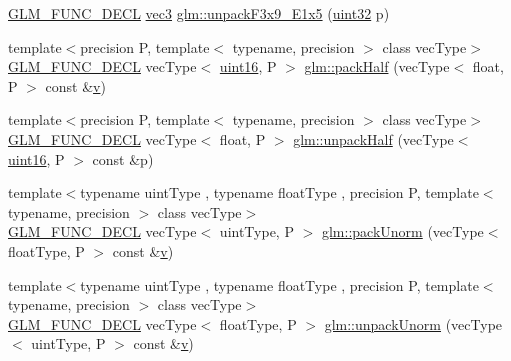 \begin{DoxyCompactItemize}
\item 
\mbox{\hyperlink{setup_8hpp_ab2d052de21a70539923e9bcbf6e83a51}{G\+L\+M\+\_\+\+F\+U\+N\+C\+\_\+\+D\+E\+CL}} \mbox{\hyperlink{group__core__types_ga1c47e8b3386109bc992b6c48e91b0be7}{vec3}} \mbox{\hyperlink{group__gtc__packing_ga15d8845a31e1e55d493803d0c8cb5910}{glm\+::unpack\+F3x9\+\_\+\+E1x5}} (\mbox{\hyperlink{group__gtc__type__precision_ga202b6a53c105fcb7e531f9b443518451}{uint32}} p)
\item 
{\footnotesize template$<$precision P, template$<$ typename, precision $>$ class vec\+Type$>$ }\\\mbox{\hyperlink{setup_8hpp_ab2d052de21a70539923e9bcbf6e83a51}{G\+L\+M\+\_\+\+F\+U\+N\+C\+\_\+\+D\+E\+CL}} vec\+Type$<$ \mbox{\hyperlink{group__gtc__type__precision_gad8c2939e1fdd8e5828b31d95c52255d5}{uint16}}, P $>$ \mbox{\hyperlink{group__gtc__packing_ga896d806b72e390eb953786cca3632ec9}{glm\+::pack\+Half}} (vec\+Type$<$ float, P $>$ const \&\mbox{\hyperlink{glad_8h_a14cfbe2fc2234f5504618905b69d1e06}{v}})
\item 
{\footnotesize template$<$precision P, template$<$ typename, precision $>$ class vec\+Type$>$ }\\\mbox{\hyperlink{setup_8hpp_ab2d052de21a70539923e9bcbf6e83a51}{G\+L\+M\+\_\+\+F\+U\+N\+C\+\_\+\+D\+E\+CL}} vec\+Type$<$ float, P $>$ \mbox{\hyperlink{group__gtc__packing_gaf3f9387834f8d8beadfe723c1dd247a7}{glm\+::unpack\+Half}} (vec\+Type$<$ \mbox{\hyperlink{group__gtc__type__precision_gad8c2939e1fdd8e5828b31d95c52255d5}{uint16}}, P $>$ const \&p)
\item 
{\footnotesize template$<$typename uint\+Type , typename float\+Type , precision P, template$<$ typename, precision $>$ class vec\+Type$>$ }\\\mbox{\hyperlink{setup_8hpp_ab2d052de21a70539923e9bcbf6e83a51}{G\+L\+M\+\_\+\+F\+U\+N\+C\+\_\+\+D\+E\+CL}} vec\+Type$<$ uint\+Type, P $>$ \mbox{\hyperlink{group__gtc__packing_gacb9a3df68172c1193c9d701a3fa4d88b}{glm\+::pack\+Unorm}} (vec\+Type$<$ float\+Type, P $>$ const \&\mbox{\hyperlink{glad_8h_a14cfbe2fc2234f5504618905b69d1e06}{v}})
\item 
{\footnotesize template$<$typename uint\+Type , typename float\+Type , precision P, template$<$ typename, precision $>$ class vec\+Type$>$ }\\\mbox{\hyperlink{setup_8hpp_ab2d052de21a70539923e9bcbf6e83a51}{G\+L\+M\+\_\+\+F\+U\+N\+C\+\_\+\+D\+E\+CL}} vec\+Type$<$ float\+Type, P $>$ \mbox{\hyperlink{group__gtc__packing_gad3d7e1ec7fcfb7ae341658e2ce1c3bd9}{glm\+::unpack\+Unorm}} (vec\+Type$<$ uint\+Type, P $>$ const \&\mbox{\hyperlink{glad_8h_a14cfbe2fc2234f5504618905b69d1e06}{v}})

\end{DoxyCompactItemize}
